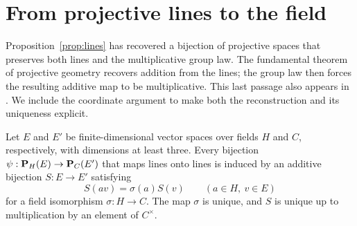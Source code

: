 \section{From projective lines to the field}
\label{sec:fields}

Proposition~\ref{prop:lines} has recovered a bijection of projective
spaces that preserves both lines and the multiplicative group law.
The fundamental theorem of projective geometry
\citep[Section~8.2, Theorem~8.2]{Hall2015} recovers addition from
the lines; the group law then forces the resulting additive map to be
multiplicative. This last passage also appears in
\citet[Section~4, Lemma~29]{CadoretPirutka2021}. We include the coordinate argument
to make both the reconstruction and its uniqueness explicit.

\begin{proposition}\label{prop:projective-lift}
Let $E$ and $E'$ be finite-dimensional vector spaces over fields $H$
and $C$, respectively, with dimensions at least three. Every bijection
$\psi:\mathbf P_H(E)\to\mathbf P_C(E')$ that maps lines onto lines is induced by
an additive bijection $S:E\to E'$ satisfying
\[
 S(av)=\sigma(a)S(v)\qquad(a\in H,\ v\in E)
\]
for a field isomorphism $\sigma:H\to C$. The map $\sigma$ is unique,
and $S$ is unique up to multiplication by an element of $C^\times$.
\end{proposition}

